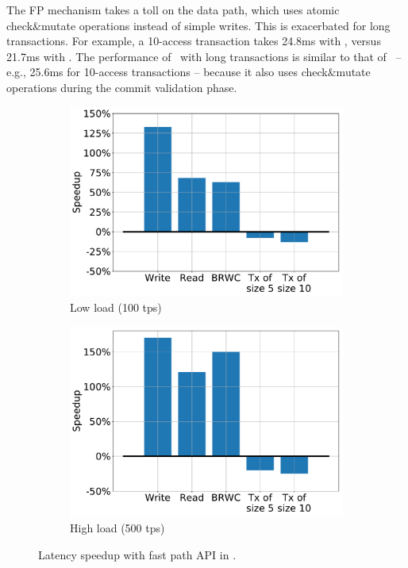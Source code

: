 The FP mechanism takes a toll on the data path, which uses atomic check\&mutate operations 
instead of simple writes. This is exacerbated for long transactions.
For example, a 10-access transaction takes 24.8ms with \sys, 
versus 21.7ms with  \sysll. The performance of \syspc\ with long transactions is similar to that of \sys\ -- e.g., 25.6ms for 10-access transactions -- 
because it also uses check\&mutate operations during the commit validation phase.

 

\begin{figure}
\centering
\begin{subfigure}[t]{0.48\textwidth}
\centerline{
\includegraphics[width=.85\textwidth]{figs/low_speedup.pdf}
}
\caption{Low load (100 tps)} 
\label{fig:slowdown-low}
\end{subfigure} 
\begin{subfigure}[t]{0.48\textwidth}
\centerline{
\includegraphics[width=.85\textwidth]{figs/high_speedup.pdf}
}
\caption{High load (500 tps)} 
\label{fig:slowdown-high}
\end{subfigure} 
\caption{Latency speedup with  fast path API in {\sys}.}
\label{fig:fp-tradeoff}
\end{figure}



